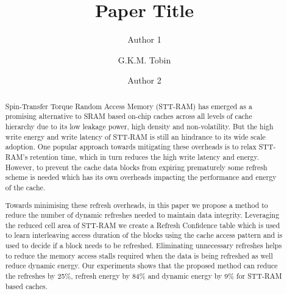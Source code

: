 \documentclass[sigconf]{acmart}
\begin{document}
\title{Paper Title}

\author{Author 1}
\author{G.K.M. Tobin}
\authornotemark[1]

\author{Author 2}

\renewcommand{\shortauthors}{Trovato and Tobin, et al.}

\begin{abstract}
 Spin-Transfer Torque Random Access Memory (STT-RAM) has emerged as a promising alternative to SRAM based on-chip caches across all levels of cache hierarchy due to its low leakage power, high density and non-volatility. But the high write energy and write latency of STT-RAM is still an hindrance to its wide scale adoption. One popular approach towards mitigating these overheads is to relax STT-RAM's retention time, which in turn reduces the high write latency and energy. However, to prevent the cache data blocks from expiring prematurely some refresh scheme is needed which has its own overheads impacting the performance and energy of the cache.
 
 Towards minimising these refresh overheads, in this paper we propose a method to reduce the number of dynamic refreshes needed to maintain data integrity. Leveraging the reduced cell area of STT-RAM we create a Refresh Confidence table which is used to learn interleaving access duration of the blocks using the cache access pattern and is used to decide if a block needs to be refreshed. Eliminating unnecessary refreshes helps to reduce the memory access stalls required when the data is being refreshed as well reduce dynamic energy. Our experiments shows that the proposed method can reduce the refreshes by 25\%, refresh energy by 84\% and dynamic energy by 9\% for STT-RAM based caches.

\end{abstract}
\end{document}
